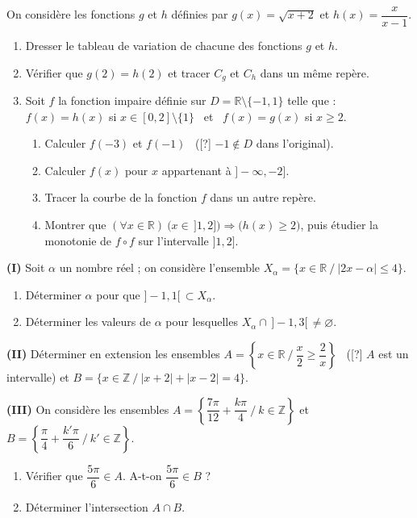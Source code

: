On considère les fonctions $g$ et $h$ définies par $g(x)=\sqrt{x+2}$ et $h(x)=\dfrac{x}{x-1}$.
\begin{enumerate}
\item Dresser le tableau de variation de chacune des fonctions $g$ et $h$.
\item Vérifier que $g(2)=h(2)$ et tracer $C_g$ et $C_h$ dans un même repère.
\item Soit $f$ la fonction impaire définie sur $D=\mathbb{R}\setminus\{-1,1\}$ telle que :
$f(x)=h(x)$ si $x\in[0,2]\setminus\{1\}$ \ et \ $f(x)=g(x)$ si $x\geq2$.
\begin{enumerate}
\item Calculer $f(-3)$ et $f(-1)$ \ ([?] $-1\notin D$ dans l'original).
\item Calculer $f(x)$ pour $x$ appartenant à $]-\infty,-2]$.
\item Tracer la courbe de la fonction $f$ dans un autre repère.
\item Montrer que $(\forall x\in\mathbb{R})\ \big(x\in\,]1,2]\big)\Rightarrow\big(h(x)\geq2\big)$, puis étudier la monotonie de $f\circ f$ sur l'intervalle $]1,2]$.
\end{enumerate}
\end{enumerate}
\fin
{}
\textbf{(I)} Soit $\alpha$ un nombre réel ; on considère l'ensemble $X_\alpha=\{x\in\mathbb{R}\ /\ |2x-\alpha|\leq4\}$.
\begin{enumerate}
\item Déterminer $\alpha$ pour que $]-1,1[\,\subset X_\alpha$.
\item Déterminer les valeurs de $\alpha$ pour lesquelles $X_\alpha\cap\,]-1,3[\,\neq\varnothing$.
\end{enumerate}
\textbf{(II)} Déterminer en extension les ensembles $A=\left\{x\in\mathbb{R}\ /\ \dfrac x2\geq\dfrac2x\right\}$ \ ([?] $A$ est un intervalle) et $B=\{x\in\mathbb{Z}\ /\ |x+2|+|x-2|=4\}$.

\textbf{(III)} On considère les ensembles $A=\left\{\dfrac{7\pi}{12}+\dfrac{k\pi}{4}\ /\ k\in\mathbb{Z}\right\}$ et $B=\left\{\dfrac\pi4+\dfrac{k'\pi}{6}\ /\ k'\in\mathbb{Z}\right\}$.
\begin{enumerate}
\item Vérifier que $\dfrac{5\pi}{6}\in A$. A-t-on $\dfrac{5\pi}{6}\in B$ ?
\item Déterminer l'intersection $A\cap B$.
\end{enumerate}
\fin
